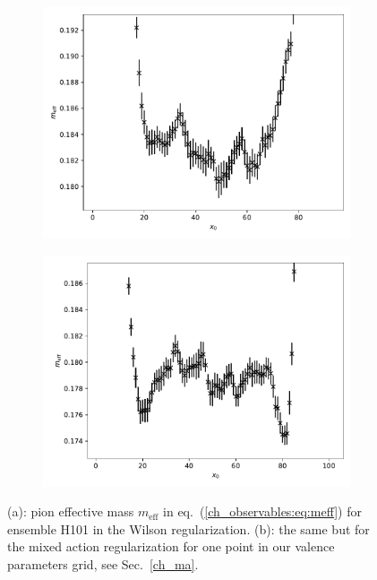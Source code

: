 \begin{figure}
    \centering
    \begin{subfigure}{1.\textwidth}
    	\includegraphics[width=\textwidth]{./cap3/figs/meff_H101.pdf}
    	\caption{}
    \end{subfigure}
    \begin{subfigure}{1.\textwidth}
    	\includegraphics[width=\textwidth]{./cap3/figs/m_tm_H101.pdf}
    	\caption{}
    \end{subfigure}
    \caption{(a): pion effective mass $m_{\textrm{eff}}$ in eq.~(\ref{ch_observables:eq:meff}) for ensemble H101 in the Wilson regularization. (b): the same but for the mixed action regularization for one point in our valence parameters grid, see Sec.~\ref{ch_ma}.}
        \label{ch_observables:fig:meff}
\end{figure}

